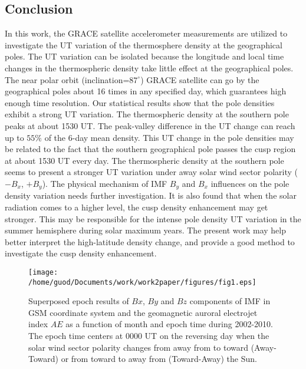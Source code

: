 \documentclass[draft, grl]{/home/guod/Documents/template/agu_template/AGUTeX}
\begin{document}
\begin{article}
\section{Conclusion}
    In this work, the GRACE satellite accelerometer measurements are utilized
    to investigate the UT variation of the thermosphere density at the 
    geographical poles. 
    The UT variation can be isolated because the longitude and local time 
    changes in the thermospheric density take little effect at the geographical
    poles. 
    The near polar orbit (inclination=$87^\circ$) GRACE satellite can go by
    the geographical poles about 16 times in any specified day, which guarantees
    high enough time resolution. 
    Our statistical results show that the pole densities exhibit a strong UT 
    variation. 
    The thermospheric density at the southern pole peaks at about 1530 UT.
    The peak-valley difference in the UT change can reach up to $55\%$ of the 
    6-day mean density.
    This UT change in the pole densities may be related to the fact that the 
    southern geographical pole passes the cusp region at about 1530 UT every 
    day.
    The thermospheric density at the southern pole seems to present a stronger
    UT variation under away solar wind sector polarity ($-B_x$, $+B_y$).
    The physical mechanism of IMF $B_y$ and $B_x$ influences on the pole density
    variation needs further investigation.
    It is also found that when the solar radiation comes to a higher level, the
    cusp density enhancement may get stronger.
    This may be responsible for the intense pole density UT variation in the 
    summer hemisphere during solar maximum years.
    The present work may help better interpret the high-latitude density change,
    and provide a good method to investigate the cusp density enhancement.



\end{article}
\begin{figure}
    \centering
    \noindent\texttt{[image: 
    /home/guod/Documents/work/work2paper/figures/fig1.eps]}
    \caption{Superposed epoch results of $Bx$, $By$ and $Bz$ components of IMF 
        in GSM coordinate system and the geomagnetic auroral electrojet index
        $AE$ as a function of month and epoch time during 2002-2010. 
        The epoch time centers at 0000 UT on the reversing day when the solar 
        wind sector polarity changes from away from to toward (Away-Toward) or
        from toward to away from (Toward-Away) the Sun. }
    \label{figure1}
\end{figure}
\end{document}
